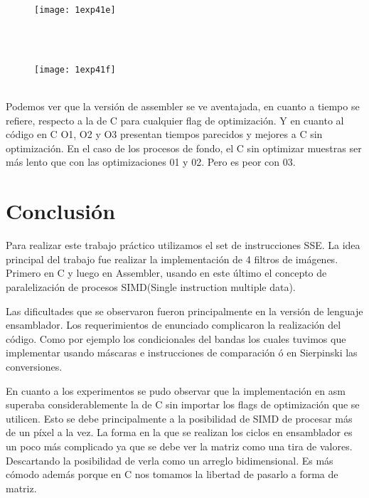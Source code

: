 ﻿\documentclass[a4paper]{article}
\begin{document}
\begin{figure}[H]
  \centering
    \texttt{[image: 1exp41e]}
\end{figure}
\ \\
\ \\
\begin{figure}[H]
  \centering
    \texttt{[image: 1exp41f]}
\end{figure}
\ \\
Podemos ver que la versión de assembler se ve aventajada, en cuanto a tiempo se refiere, respecto a la de C para cualquier flag de optimización. Y en cuanto al código en C O1, O2 y O3 presentan tiempos parecidos y mejores a C sin optimización. En el caso de los procesos de fondo, el C sin optimizar muestras ser más lento que con las optimizaciones 01 y 02. Pero es peor con 03.   

\section{Conclusi\'on}

Para realizar este trabajo práctico utilizamos el set de instrucciones SSE. La idea principal del trabajo fue realizar la implementación de 4 filtros de imágenes. Primero en C y luego en Assembler, usando en este último el concepto de paralelización de procesos SIMD(Single instruction multiple data). 

Las dificultades que se observaron fueron principalmente en la versión de lenguaje ensamblador. Los requerimientos de enunciado complicaron la realización del código. Como por ejemplo los condicionales del bandas los cuales tuvimos que implementar usando máscaras e instrucciones de comparación ó en Sierpinski las conversiones. 

En cuanto a los experimentos se pudo observar que la implementación en asm superaba considerablemente la de C sin importar los flags de optimización que se utilicen. Esto se debe principalmente a la posibilidad de SIMD de procesar más de un píxel a la vez. La forma en la que se realizan los ciclos en ensamblador es un poco más complicado ya que se debe ver la matriz como una tira de valores. Descartando la posibilidad de verla como un arreglo bidimensional. Es más cómodo además porque en C nos tomamos la libertad de pasarlo a forma de matriz. 
\end{document}
